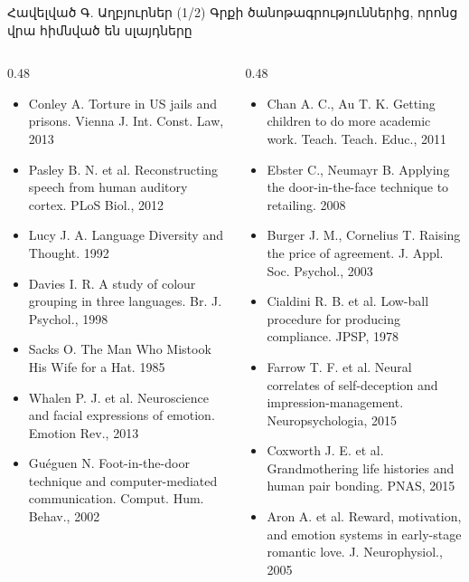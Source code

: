 \begin{frame}{Հավելված Գ. Աղբյուրներ (1/2)}
  \scriptsize
  Գրքի ծանոթագրություններից, որոնց վրա հիմնված են սլայդները\par\smallskip
  \begin{columns}[T]
    \begin{column}{0.48\textwidth}
      \begin{itemize}\setlength{\itemsep}{0.4mm}
        \item Conley A. Torture in US jails and prisons. Vienna J. Int. Const. Law, 2013
        \item Pasley B. N. et al. Reconstructing speech from human auditory cortex. PLoS Biol., 2012
        \item Lucy J. A. Language Diversity and Thought. 1992
        \item Davies I. R. A study of colour grouping in three languages. Br. J. Psychol., 1998
        \item Sacks O. The Man Who Mistook His Wife for a Hat. 1985
        \item Whalen P. J. et al. Neuroscience and facial expressions of emotion. Emotion Rev., 2013
        \item Guéguen N. Foot-in-the-door technique and computer-mediated communication. Comput. Hum. Behav., 2002
      \end{itemize}
    \end{column}
    \begin{column}{0.48\textwidth}
      \begin{itemize}\setlength{\itemsep}{0.4mm}
        \item Chan A. C., Au T. K. Getting children to do more academic work. Teach. Teach. Educ., 2011
        \item Ebster C., Neumayr B. Applying the door-in-the-face technique to retailing. 2008
        \item Burger J. M., Cornelius T. Raising the price of agreement. J. Appl. Soc. Psychol., 2003
        \item Cialdini R. B. et al. Low-ball procedure for producing compliance. JPSP, 1978
        \item Farrow T. F. et al. Neural correlates of self-deception and impression-management. Neuropsychologia, 2015
        \item Coxworth J. E. et al. Grandmothering life histories and human pair bonding. PNAS, 2015
        \item Aron A. et al. Reward, motivation, and emotion systems in early-stage romantic love. J. Neurophysiol., 2005
      \end{itemize}
    \end{column}
  \end{columns}
\end{frame}

